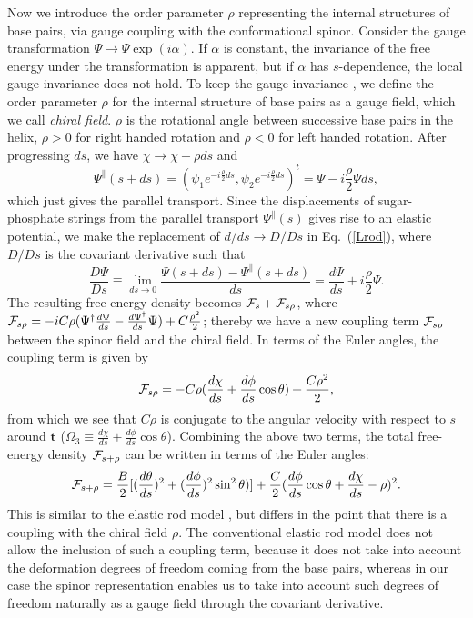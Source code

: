 \documentclass[pre,showpacs,twocolumn,superscriptaddress]{revtex4}
\newcommand{\cF}{ {\cal F} }
\begin{document}
Now we introduce the order parameter $\rho$ representing the internal structures of 
base pairs, 
 via gauge coupling with the conformational 
spinor. 
Consider the gauge transformation $ \Psi \to \Psi \exp(i \alpha) $.  
If $ \alpha $ is constant, the invariance of the free energy under the transformation 
is apparent, but if $ \alpha $ has $s$-dependence, the local gauge invariance does 
not hold. 
To keep the gauge invariance \cite{deGennes}, 
we define the order parameter $\rho$ for the internal structure of base pairs as a 
gauge field, which we call {\em chiral field}.
$\rho$ is the rotational angle between successive base pairs in the helix, 
$\rho>0$ for right handed rotation and $ \rho<0 $ for left handed rotation. 
After progressing $ ds $, we have $\chi \to \chi+ \rho ds$ and 
\begin{equation*}
\Psi^{\parallel}(s+ds) 
= 
(\psi_1 e^{-i  \frac{\rho}{2} ds},\psi_2 e^{-i  \frac{\rho}{2} ds})^t
= 
\Psi-i \frac{\rho}{2}  \Psi ds,
\end{equation*}
which just gives the parallel transport. 
Since the displacements of sugar-phosphate strings 
from the parallel transport $\Psi^{\parallel}(s)$
gives rise to an elastic potential,
we make the replacement of $d/ds \to D/Ds$ in Eq.~(\ref{Lrod}),
where
$D/Ds$ is the covariant derivative such that
\begin{equation*}
\frac{D \Psi}{Ds} \equiv 
\lim_{ds \to 0} \frac{\Psi(s+ds)-\Psi^{\parallel}(s+ds)}{ds}
=\frac{d \Psi}{ds} +i \frac{\rho}{2} \Psi
.
\end{equation*}
The resulting free-energy density becomes 
$\cF_s+\cF_{s\rho}$, 
where
$ \cF_{s\rho}= -iC \rho(\Psi^{\dagger}\frac{d\Psi}{ds} - 
\frac{d\Psi^\dagger}{ds} 
\Psi
)+C\frac{\rho^2}{2}
$; 
thereby
we have a new coupling term $\cF_{s\rho}$ between
the spinor field and the chiral field.
In terms of the Euler angles, the coupling term is given by 
\begin{equation*}
\cF_{s\rho}=-C\rho( \frac{d\chi}{ds}+ \frac{d\phi}{ds} \cos 
\theta)+\frac{C\rho^2}{2},
\end{equation*}
from which we see that $C\rho $ is conjugate to 
the angular velocity with respect to $s$ around ${\bm t}$
($ \Omega_3 \equiv \frac{d\chi}{ds}+ \frac{d\phi}{ds}\cos \theta $). 
Combining the above two terms, the total free-energy density $
\cF_{s+\rho} $  can be written in terms of the Euler angles:
 \begin{equation}
  \cF_{s+\rho}  =    
   \frac{B}{2}[(\frac{d\theta}{ds})^2 +(\frac{d\phi}{ds})^2
   \sin^2\theta)]
   +\frac{C}{2}( \frac{d\phi}{ds}\cos \theta +\frac{d\chi}{ds}  - \rho
		) ^2.
\label{gaugeRod}
\end{equation} 
This is similar to the elastic rod model
\cite{MarkoSiggia},
but differs in the point that there is a coupling 
with the chiral field $ \rho $.
The conventional elastic rod model
does not allow the inclusion of such a coupling term,
because it does not take into account the
deformation degrees of freedom coming from the base pairs, 
whereas in our case the spinor representation 
enables us to take into account such degrees of freedom
naturally as a gauge field through the covariant derivative. 
\end{document}
